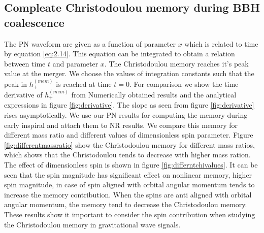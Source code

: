 \documentclass[prd,preprintnumbers,twocolumn,eqsecnum,floatfix,letter]{revtex4}
\begin{document}
\subsection{Compleate Christodoulou memory during BBH coalescence} 
The PN waveform are given as a function of parameter $x$ which is related to time by equation \ref{eq:2.14}. This equation can be integrated to obtain a relation between time $t$ and parameter $x$. The Christodoulou memory reaches it's peak value at the merger. We choose the values of integration constants such that the peak in $h_+^{(mem)}$ is reached at time $t=0$. For comparison we show the time derivative of $h_+^{(mem)}$ from Numerically obtained results and the analytical expressions in figure \ref{fig:derivative}. The slope as seen from figure \ref{fig:derivative} rises asymptotically. We use our PN results for computing the memory during early inspiral and attach them to NR results. We compare this memory for different mass ratio and different values of dimensionless spin parameter. Figure \ref{fig:differentmassratio} show the Christodoulou memory for different mass ratios, which shows that the Christodoulou tends to decrease with higher mass ration. The effect of dimensionless spin is shown in figure \ref{fig:differntchivalues}. It can be seen that the spin magnitude has significant effect on nonlinear memory, higher spin magnitude, in case of spin aligned with orbital angular momentum tends to increase the memory contribution. When the spins are anti aligned with orbital angular momentum, the memory tend to decrease the Christodoulou memory. These results show it important to consider the spin contribution when studying the Christodoulou memory in gravitational wave signals. 
\end{document}
